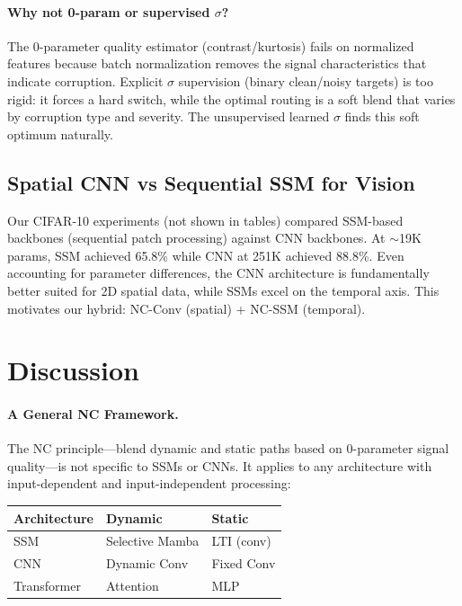 \documentclass[10pt,twocolumn,letterpaper]{article}
\begin{document}
\paragraph{Why not 0-param or supervised $\sigma$?}
The 0-parameter quality estimator (contrast/kurtosis) fails on normalized features because batch normalization removes the signal characteristics that indicate corruption.
Explicit $\sigma$ supervision (binary clean/noisy targets) is too rigid: it forces a hard switch, while the optimal routing is a soft blend that varies by corruption type and severity.
The unsupervised learned $\sigma$ finds this soft optimum naturally.

\subsection{Spatial CNN vs Sequential SSM for Vision}

Our CIFAR-10 experiments (not shown in tables) compared SSM-based backbones (sequential patch processing) against CNN backbones.
At $\sim$19K params, SSM achieved 65.8\% while CNN at 251K achieved 88.8\%.
Even accounting for parameter differences, the CNN architecture is fundamentally better suited for 2D spatial data, while SSMs excel on the temporal axis.
This motivates our hybrid: NC-Conv (spatial) + NC-SSM (temporal).


\section{Discussion}
\label{sec:discussion}

\paragraph{A General NC Framework.}
The NC principle---blend dynamic and static paths based on 0-parameter signal quality---is not specific to SSMs or CNNs.
It applies to any architecture with input-dependent and input-independent processing:

\begin{center}
\setlength{\tabcolsep}{3pt}
\footnotesize
\begin{tabular}{lll}
\toprule
\textbf{Architecture} & \textbf{Dynamic} & \textbf{Static} \\
\midrule
SSM & Selective Mamba & LTI (conv) \\
CNN & Dynamic Conv & Fixed Conv \\
Transformer & Attention & MLP \\
\bottomrule
\end{tabular}
\end{center}
\end{document}
